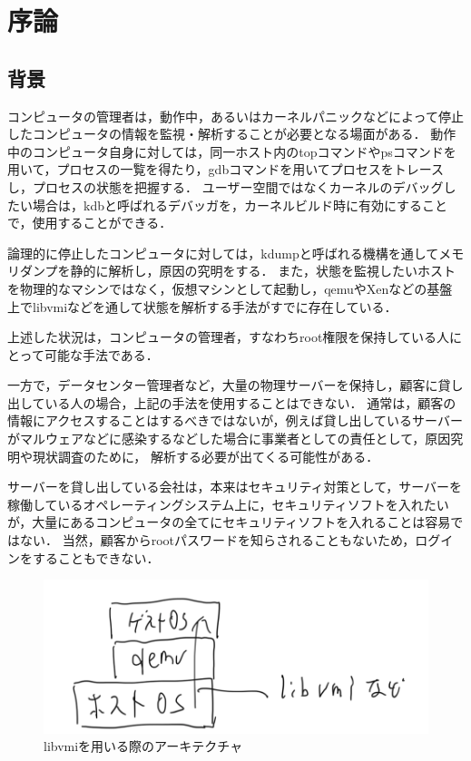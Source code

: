\chapter{序論}
\label{chap:introduction}

\section{背景}
\label{section:background}

コンピュータの管理者は，動作中，あるいはカーネルパニックなどによって停止したコンピュータの情報を監視・解析することが必要となる場面がある．
動作中のコンピュータ自身に対しては，同一ホスト内のtopコマンドやpsコマンドを用いて，プロセスの一覧を得たり，gdbコマンドを用いてプロセスをトレースし，プロセスの状態を把握する．
ユーザー空間ではなくカーネルのデバッグしたい場合は，kdbと呼ばれるデバッガを，カーネルビルド時に有効にすることで，使用することができる．

論理的に停止したコンピュータに対しては，kdumpと呼ばれる機構を通してメモリダンプを静的に解析し，原因の究明をする．
また，状態を監視したいホストを物理的なマシンではなく，仮想マシンとして起動し，qemuやXenなどの基盤上でlibvmiなどを通して状態を解析する手法がすでに存在している．

上述した状況は，コンピュータの管理者，すなわちroot権限を保持している人にとって可能な手法である．

一方で，データセンター管理者など，大量の物理サーバーを保持し，顧客に貸し出している人の場合，上記の手法を使用することはできない．
通常は，顧客の情報にアクセスすることはするべきではないが，例えば貸し出しているサーバーがマルウェアなどに感染するなどした場合に事業者としての責任として，原因究明や現状調査のために，
解析する必要が出てくる可能性がある．

サーバーを貸し出している会社は，本来はセキュリティ対策として，サーバーを稼働しているオペレーティングシステム上に，セキュリティソフトを入れたいが，大量にあるコンピュータの全てにセキュリティソフトを入れることは容易ではない．
当然，顧客からrootパスワードを知らされることもないため，ログインをすることもできない．

\begin{figure}[htbp]
    \caption{libvmiを用いる際のアーキテクチャ}
    \label{fig:zentai}
    \begin{center}
        \includegraphics[bb=0 0 1000 340,width=15cm]{img/tegaki/01_vm.png}
    \end{center}
\end{figure}

